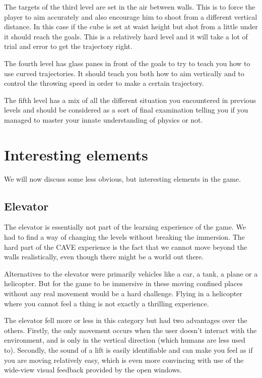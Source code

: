 \documentclass[a4paper]{article}
\begin{document}
The targets of the third level are set in the air between walls. This is to
force the player to aim accurately and also encourage him to shoot from a
different vertical distance. In this case if the cube is set at waist height but
shot from a little under it should reach the goals. This is a relatively hard
level and it will take a lot of trial and error to get the trajectory right.

The fourth level has glass panes in front of the goals to try to teach you how
to use curved trajectories. It should teach you both how to aim vertically and
to control the throwing speed in order to make a certain trajectory.

The fifth level has a mix of all the different situation you encountered in
previous levels and should be considered as a sort of final examination telling
you if you managed to master your innate understanding of physics or not.


\section{Interesting elements}
\label{sec:elements}
We will now discuss some less obvious, but interesting elements in the game.

\subsection{Elevator}

The elevator is essentially not part of the learning experience of the game.
We had to find a way of changing the levels without breaking the immersion.
The hard part of the CAVE experience is the fact that we cannot move beyond
the walls realistically, even though there might be a world out there.

Alternatives to the elevator were primarily vehicles like a car, a tank, a
plane or a helicopter. But for the game to be immersive in these moving confined places
without any real movement would be a hard challenge. Flying in a helicopter
where you cannot feel a thing is not exactly a thrilling experience.

The elevator fell more or less in this category but had two advantages over the
others. Firstly, the only movement occurs when the user doesn't interact with the
environment, and is only in the vertical direction (which humans are less used to).
Secondly, the sound of a lift is easily identifiable and can make you feel as if
you are moving relatively easy, which is even more convincing with use of the 
wide-view visual feedback provided by the open windows. 
\end{document}
